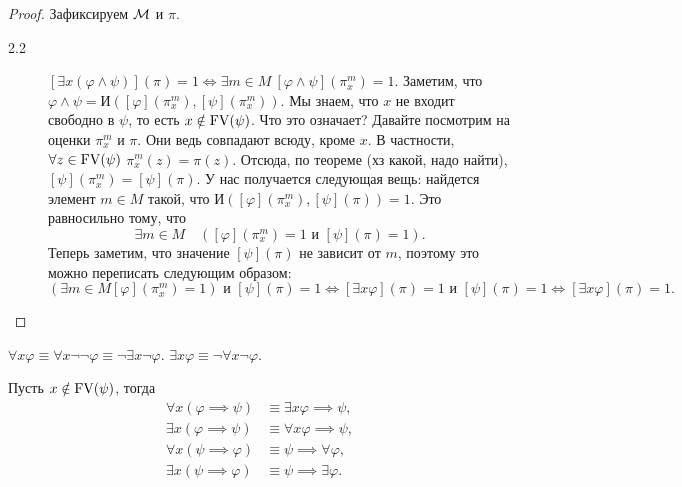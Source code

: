 \begin{proof}
    Зафиксируем $\mathcal{M}$ и $\pi$.

    \begin{description}
        \item[2.2] $[\exists x (\varphi \land \psi)](\pi) = 1 \iff \exists m \in M~ [\varphi \land \psi]\left(\pi_{x}^{m}\right) = 1$.
        Заметим, что $\varphi \land \psi = \text{И}\left([\varphi]\left(\pi_{x}^{m}\right), [\psi]\left(\pi_{x}^{m}\right)\right)$.
        Мы знаем, что $x$ не входит свободно в $\psi$, то есть $x \notin \mathrm{FV}(\psi)$.
        Что это означает?
        Давайте посмотрим на оценки $\pi_{x}^{m}$ и $\pi$.
        Они ведь совпадают всюду, кроме $x$.
        В частности, $\forall z \in \mathrm{FV}(\psi)$ $\pi_{x}^{m}(z) = \pi(z)$.
        Отсюда, по теореме (хз какой, надо найти), $[\psi]\left(\pi_{x}^{m}\right) = [\psi](\pi)$.
        У нас получается следующая вещь: найдется элемент $m \in M$ такой, что $\text{И}\left([\varphi]\left(\pi_{x}^{m}\right), [\psi]\left(\pi\right)\right) = 1$.
        Это равносильно тому, что
        $$
            \exists m \in M \quad ([\varphi]\left(\pi_{x}^{m}\right) = 1 \text{ и } [\psi](\pi) = 1).
        $$
        Теперь заметим, что значение $[\psi](\pi)$ не зависит от $m$, поэтому это можно переписать следующим образом:
        $$
            (\exists m \in M [\varphi]\left(\pi_{x}^{m}\right) = 1) \text{ и } [\psi](\pi) = 1 \iff [\exists x \varphi](\pi) = 1 \text{ и } [\psi](\pi) = 1 \iff [\exists x \varphi](\pi) = 1.
        $$
    \end{description}
\end{proof}

\begin{corollary}
    $\forall x \varphi \equiv \forall x \neg \neg \varphi \equiv \neg \exists x \neg \varphi$.
    $\exists x \varphi \equiv \neg \forall x \neg \varphi$.
\end{corollary}

\begin{corollary}
    Пусть $x \notin \mathrm{FV}(\psi)$, тогда
    \begin{align}
        \forall x (\varphi \implies \psi) &\equiv \exists x\varphi \implies \psi, \\
        \exists x (\varphi \implies \psi) &\equiv \forall x\varphi \implies \psi, \\
        \forall x (\psi \implies \varphi) &\equiv \psi \implies \forall \varphi, \\
        \exists x (\psi \implies \varphi) &\equiv \psi \implies \exists \varphi.
    \end{align}
\end{corollary}

